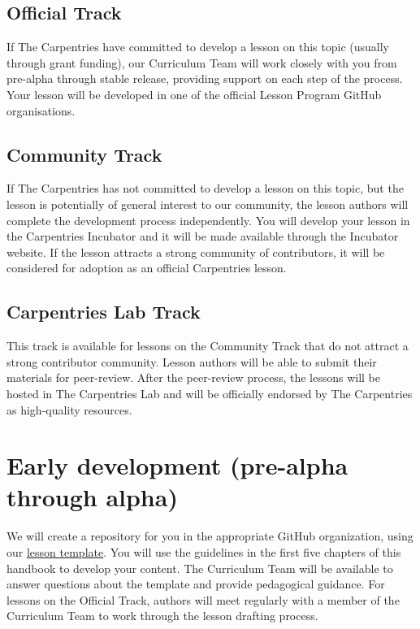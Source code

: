 \documentclass[]{book}
\begin{document}
\hypertarget{official-track}{%
\subsection{Official Track}\label{official-track}}

If The Carpentries have committed to develop a lesson
on this topic (usually through grant funding), our
Curriculum Team will work closely with you from
pre-alpha through stable release, providing support on
each step of the process. Your lesson will be
developed in one of the official Lesson Program GitHub
organisations.

\hypertarget{community-track}{%
\subsection{Community Track}\label{community-track}}

If The Carpentries has not committed to develop a
lesson on this topic, but the lesson is potentially of
general interest to our community, the lesson authors
will complete the development process independently.
You will develop
your lesson in the Carpentries Incubator and it will be
made available through the Incubator
website. If the lesson attracts a strong community
of contributors, it will be considered for adoption
as an official Carpentries lesson.

\hypertarget{carpentries-lab-track}{%
\subsection{Carpentries Lab Track}\label{carpentries-lab-track}}

This track is available for lessons on the Community
Track that do not attract a strong contributor
community. Lesson authors will be able to submit their
materials for peer-review. After the peer-review
process, the lessons will be hosted in The Carpentries
Lab and will be officially endorsed by The Carpentries
as high-quality resources.

\hypertarget{early-development-pre-alpha-through-alpha}{%
\section{Early development (pre-alpha through alpha)}\label{early-development-pre-alpha-through-alpha}}

We will create a repository for you in the appropriate
GitHub organization, using our
\href{https://github.com/carpentries/styles}{lesson template}. You will use the
guidelines in the first five chapters of this handbook
to develop your content. The Curriculum Team will
be available to answer questions about the template
and provide pedagogical guidance. For lessons on the
Official Track, authors will meet regularly with
a member of the Curriculum Team to work through the
lesson drafting process.
\end{document}
